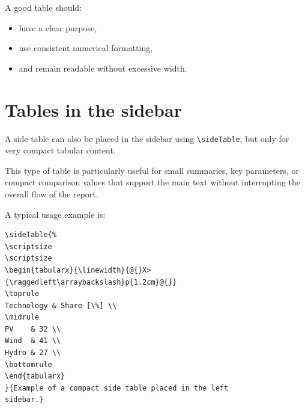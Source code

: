 \documentclass[11pt,a4paper]{report}
\begin{document}
A good table should:
\begin{itemize}
    \item have a clear purpose,
    \item use consistent numerical formatting,
    \item and remain readable without excessive width.
\end{itemize}

\section{Tables in the sidebar}


A side table can also be placed in the sidebar using \texttt{\textbackslash sideTable}, but only for very compact tabular content.

This type of table is particularly useful for small summaries, key parameters, or compact comparison values that support the main text without interrupting the overall flow of the report.

A typical usage example is:

\begin{coloredBlock}[grey]{}
\begin{verbatim}
\sideTable{%
\scriptsize
\scriptsize
\begin{tabularx}{\linewidth}{@{}X>
{\raggedleft\arraybackslash}p{1.2cm}@{}}
\toprule
Technology & Share [\%] \\
\midrule
PV    & 32 \\
Wind  & 41 \\
Hydro & 27 \\
\bottomrule
\end{tabularx}
}{Example of a compact side table placed in the left 
sidebar.}
\end{verbatim}
\end{coloredBlock}

\clearpage


\end{document}
